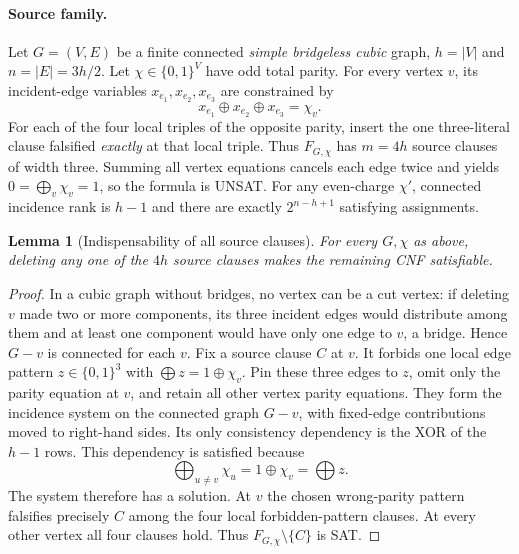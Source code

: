 \documentclass[11pt]{article}
\newtheorem{lemma}{Lemma}
\begin{document}
\paragraph{Source family.}
Let $G=(V,E)$ be a finite connected \emph{simple bridgeless cubic} graph, $h=|V|$ and $n=|E|=3h/2$. Let $\chi\in\{0,1\}^V$ have odd total parity. For every vertex $v$, its incident-edge variables $x_{e_1},x_{e_2},x_{e_3}$ are constrained by
\[
 x_{e_1}\oplus x_{e_2}\oplus x_{e_3}=\chi_v.
\]
For each of the four local triples of the opposite parity, insert the one three-literal clause falsified \emph{exactly} at that local triple. Thus $F_{G,\chi}$ has $m=4h$ source clauses of width three. Summing all vertex equations cancels each edge twice and yields $0=\bigoplus_v\chi_v=1$, so the formula is UNSAT. For any even-charge $\chi'$, connected incidence rank is $h-1$ and there are exactly $2^{n-h+1}$ satisfying assignments.

\begin{lemma}[Indispensability of all source clauses]
For every $G,\chi$ as above, deleting any one of the $4h$ source clauses makes the remaining CNF satisfiable.
\end{lemma}
\begin{proof}
In a cubic graph without bridges, no vertex can be a cut vertex: if deleting $v$ made two or more components, its three incident edges would distribute among them and at least one component would have only one edge to $v$, a bridge. Hence $G-v$ is connected for each $v$.
Fix a source clause $C$ at $v$. It forbids one local edge pattern $z\in\{0,1\}^3$ with $\bigoplus z=1\oplus\chi_v$. Pin these three edges to $z$, omit only the parity equation at $v$, and retain all other vertex parity equations. They form the incidence system on the connected graph $G-v$, with fixed-edge contributions moved to right-hand sides. Its only consistency dependency is the XOR of the $h-1$ rows. This dependency is satisfied because
\[
 \bigoplus_{u\ne v}\chi_u = 1\oplus\chi_v = \bigoplus z.
\]
The system therefore has a solution. At $v$ the chosen wrong-parity pattern falsifies precisely $C$ among the four local forbidden-pattern clauses. At every other vertex all four clauses hold. Thus $F_{G,\chi}\setminus\{C\}$ is SAT.
\end{proof}
\end{document}
